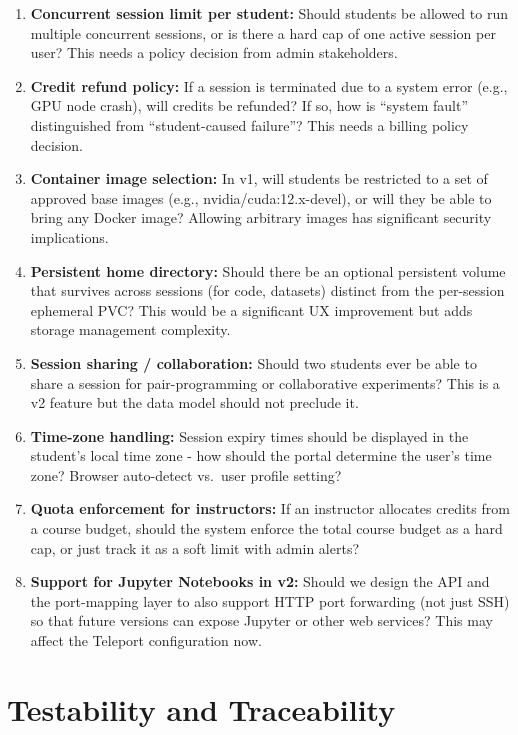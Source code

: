 \documentclass[12pt,a4paper]{article}
\begin{document}
\begin{enumerate}[leftmargin=1.5em]
  \item \textbf{Concurrent session limit per student:} Should students be allowed to run multiple concurrent sessions, or is there a hard cap of one active session per user? This needs a policy decision from admin stakeholders.
  \item \textbf{Credit refund policy:} If a session is terminated due to a system error (e.g., GPU node crash), will credits be refunded? If so, how is ``system fault'' distinguished from ``student-caused failure''? This needs a billing policy decision.
  \item \textbf{Container image selection:} In v1, will students be restricted to a set of approved base images (e.g., nvidia/cuda:12.x-devel), or will they be able to bring any Docker image? Allowing arbitrary images has significant security implications.
  \item \textbf{Persistent home directory:} Should there be an optional persistent volume that survives across sessions (for code, datasets) distinct from the per-session ephemeral PVC? This would be a significant UX improvement but adds storage management complexity.
  \item \textbf{Session sharing / collaboration:} Should two students ever be able to share a session for pair-programming or collaborative experiments? This is a v2 feature but the data model should not preclude it.
  \item \textbf{Time-zone handling:} Session expiry times should be displayed in the student's local time zone - how should the portal determine the user's time zone? Browser auto-detect vs.\ user profile setting?
  \item \textbf{Quota enforcement for instructors:} If an instructor allocates credits from a course budget, should the system enforce the total course budget as a hard cap, or just track it as a soft limit with admin alerts?
  \\
  \item \textbf{Support for Jupyter Notebooks in v2:} Should we design the API and the port-mapping layer to also support HTTP port forwarding (not just SSH) so that future versions can expose Jupyter or other web services? This may affect the Teleport configuration now.
\end{enumerate}
\section{Testability and Traceability}
\end{document}
